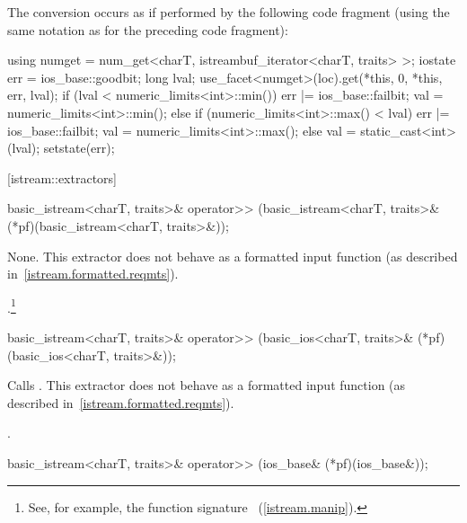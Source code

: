 \begin{itemdescr}
\pnum
The conversion occurs as if performed by the following code fragment
(using the same notation as for the preceding code fragment):
\begin{codeblock}
using numget = num_get<charT, istreambuf_iterator<charT, traits> >;
iostate err = ios_base::goodbit;
long lval;
use_facet<numget>(loc).get(*this, 0, *this, err, lval);
if (lval < numeric_limits<int>::min()) {
  err |= ios_base::failbit;
  val = numeric_limits<int>::min();
} else if (numeric_limits<int>::max() < lval) {
  err |= ios_base::failbit;
  val = numeric_limits<int>::max();
}  else
  val = static_cast<int>(lval);
setstate(err);
\end{codeblock}
\end{itemdescr}

[istream::extractors]{}

%
\begin{itemdecl}
basic_istream<charT, traits>& operator>>
    (basic_istream<charT, traits>& (*pf)(basic_istream<charT, traits>&));
\end{itemdecl}

\begin{itemdescr}
\pnum
\effects
None.
This extractor does not behave as a formatted input function
(as described in~\ref{istream.formatted.reqmts}).

\pnum
\returns
{}.\footnote{See, for example, the function signature
~(\ref{istream.manip}).%
}%
\end{itemdescr}

%
\begin{itemdecl}
basic_istream<charT, traits>& operator>>
    (basic_ios<charT, traits>& (*pf)(basic_ios<charT, traits>&));
\end{itemdecl}

\begin{itemdescr}
\pnum
\effects
Calls
.
This extractor does not behave as a formatted input function
(as described in~\ref{istream.formatted.reqmts}).

\pnum
\returns
{}.
\end{itemdescr}

%
\begin{itemdecl}
basic_istream<charT, traits>& operator>>
    (ios_base& (*pf)(ios_base&));
\end{itemdecl}

